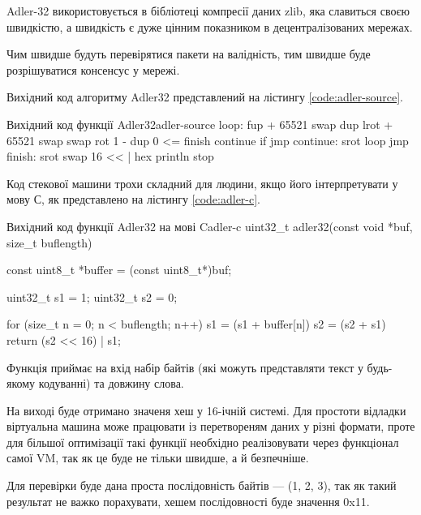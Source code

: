 \documentclass{lib/styles/default-style}
\begin{document}
    Adler-32 використовується в бібліотеці компресії даних zlib, яка славиться своєю швидкістю, а швидкість є дуже цінним показником
    в децентралізованих мережах.

    Чим швидше будуть перевірятися пакети на валідність, тим швидше буде розрішуватися консенсус у мережі.

    Вихідний код алгоритму Adler32 представлений на лістингу \ref{code:adler-source}.

    \begin{code}{Вихідний код функції Adler32}{adler-source}
        loop:
        fup
        +
        65521
        swap
        dup
        lrot
        +
        65521
        swap
        swap
        rot
        1
        -
        dup
        0
        <= finish continue if jmp
    continue:
        srot
        loop jmp
    finish:
        srot
        swap
        16
        <<
        |
        hex
        println
        stop\end{code}

    Код стекової машини трохи складний для людини, якщо його інтерпретувати у мову С, як представлено на лістингу \ref{code:adler-c}.

    \begin{code}{Вихідний код функції Adler32 на мові C}{adler-c}
        uint32_t adler32(const void *buf, size_t buflength) {
            const uint8_t *buffer = (const uint8_t*)buf;

            uint32_t s1 = 1;
            uint32_t s2 = 0;

            for (size_t n = 0; n < buflength; n++) {
                s1 = (s1 + buffer[n]) %
                s2 = (s2 + s1) %
            }     
            return (s2 << 16) | s1;
        }\end{code}

    Функція приймає на вхід набір байтів (які можуть представляти текст у будь-якому кодуванні) та довжину слова.
    
    На виході буде отримано значеня хеш у 16-ічній системі. Для простоти відладки віртуальна машина
    може працювати із перетвореням даних у різні формати, проте для більшої оптимізації такі функції необхідно реалізовувати
    через функціонал самої VM, так як це буде не тільки швидше, а й безпечніше.

    Для перевірки буде дана проста послідовність байтів --- (1, 2, 3), так як такий результат не важко порахувати,
    хешем послідовності буде значення 0x11.
\end{document}
